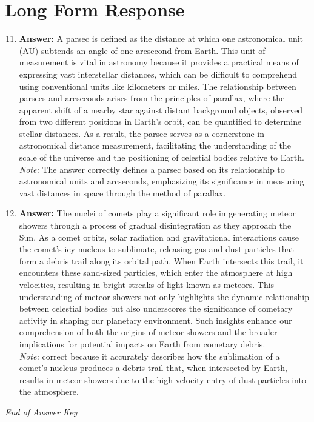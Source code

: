 \documentclass[12pt]{article}
\begin{document}
\section*{Long Form Response}
\begin{enumerate}[label=\arabic*.]
\setcounter{enumi}{10}
\item \textbf{Answer:} A parsec is defined as the distance at which one astronomical unit (AU) subtends an angle of one arcsecond from Earth. This unit of measurement is vital in astronomy because it provides a practical means of expressing vast interstellar distances, which can be difficult to comprehend using conventional units like kilometers or miles. The relationship between parsecs and arcseconds arises from the principles of parallax, where the apparent shift of a nearby star against distant background objects, observed from two different positions in Earth's orbit, can be quantified to determine stellar distances. As a result, the parsec serves as a cornerstone in astronomical distance measurement, facilitating the understanding of the scale of the universe and the positioning of celestial bodies relative to Earth.
\\ \textit{Note:} The answer correctly defines a parsec based on its relationship to astronomical units and arcseconds, emphasizing its significance in measuring vast distances in space through the method of parallax.
\item \textbf{Answer:} The nuclei of comets play a significant role in generating meteor showers through a process of gradual disintegration as they approach the Sun. As a comet orbits, solar radiation and gravitational interactions cause the comet's icy nucleus to sublimate, releasing gas and dust particles that form a debris trail along its orbital path. When Earth intersects this trail, it encounters these sand-sized particles, which enter the atmosphere at high velocities, resulting in bright streaks of light known as meteors. This understanding of meteor showers not only highlights the dynamic relationship between celestial bodies but also underscores the significance of cometary activity in shaping our planetary environment. Such insights enhance our comprehension of both the origins of meteor showers and the broader implications for potential impacts on Earth from cometary debris.
\\ \textit{Note:} correct because it accurately describes how the sublimation of a comet's nucleus produces a debris trail that, when intersected by Earth, results in meteor showers due to the high-velocity entry of dust particles into the atmosphere.
\end{enumerate}

\vfill
\noindent\textit{End of Answer Key}
\end{document}
